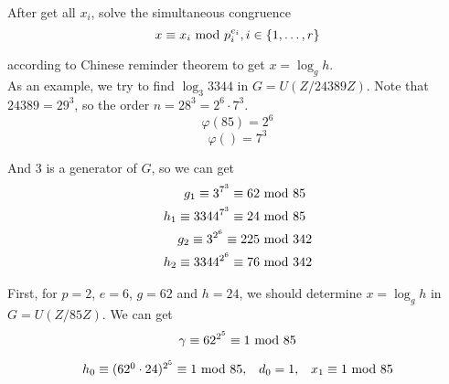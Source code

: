 \documentclass{article}
\renewcommand{\mod}{{\rm\ mod\ }}
\begin{document}
After get all $x_i$, solve the simultaneous congruence $$x\equiv x_i \mod p_i^{e_i},i\in\{1,\dots,r\}$$

according to Chinese reminder theorem to get $x=\log_gh$.\\

As an example, we try to find $\log_3 3344$ in $G=U(Z/24389Z).$ Note that $24389=29^3$, so the order $n=28^3=2^6\cdot7^3$.
$$\varphi(85)=2^6$$
$$\varphi()=7^3$$

And 3 is a generator of $G$, so we can get 
\begin{align*}
g_1\equiv 3^{7^3}\equiv 62 &\mod 85\\
h_1\equiv 3344^{7^3}\equiv 24 &\mod 85\\
g_2\equiv 3^{2^6}\equiv 225 &\mod 342\\
h_2\equiv 3344^{2^6}\equiv 76 &\mod 342
\end{align*}

First, for $p=2$, $e=6$, $g=62$ and $h=24$, we should determine $x=\log_gh$ in $G=U(Z/85Z)$. We can get
$$\gamma\equiv 62^{2^5} \equiv 1 \mod 85$$

$$
\begin{array}{ccc}
h_0 \equiv (62^{0}\cdot 24)^{2^5} \equiv 1 \mod 85, & d_0=1, & x_1\equiv 1 \mod 85 \\
\end{array}
$$

$$$$
$$$$
\end{document}
